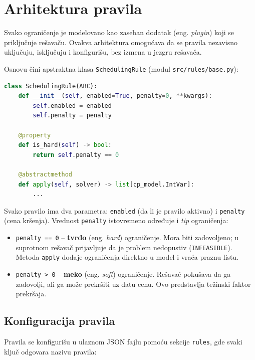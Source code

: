 \documentclass[12pt,oneside]{memoir}
\begin{document}
\section{Arhitektura pravila}
\label{sec:arhitektura_pravila}

Svako ograničenje je modelovano kao zaseban dodatak (eng. \emph{plugin})
koji se priključuje rešavaču. Ovakva arhitektura omogućava da se pravila
nezavisno uključuju, isključuju i konfigurišu, bez izmena u jezgru
rešavača.

Osnovu čini apstraktna klasa \texttt{SchedulingRule} (modul
\texttt{src/rules/base.py}):

\begin{english}
\begin{lstlisting}[language=Python, caption={Apstraktna klasa pravila}]
class SchedulingRule(ABC):
    def __init__(self, enabled=True, penalty=0, **kwargs):
        self.enabled = enabled
        self.penalty = penalty

    @property
    def is_hard(self) -> bool:
        return self.penalty == 0

    @abstractmethod
    def apply(self, solver) -> list[cp_model.IntVar]:
        ...
\end{lstlisting}
\end{english}

Svako pravilo ima dva parametra: \texttt{enabled} (da li je pravilo
aktivno) i \texttt{penalty} (cena kršenja). Vrednost \texttt{penalty}
istovremeno određuje i \emph{tip} ograničenja:

\begin{itemize}
\item \texttt{penalty == 0} -- \textbf{tvrdo} (eng. \emph{hard})
  ograničenje. Mora biti zadovoljeno; u suprotnom rešavač prijavljuje
  da je problem nedopustiv (\texttt{INFEASIBLE}). Metoda \texttt{apply}
  dodaje ograničenja direktno u model i vraća praznu listu.
\item \texttt{penalty > 0} -- \textbf{meko} (eng. \emph{soft})
  ograničenje. Rešavač pokušava da ga zadovolji, ali ga može prekršiti
  uz datu cenu. Ovo predstavlja težinski faktor prekršaja.
\end{itemize}

\subsection{Konfiguracija pravila}

Pravila se konfigurišu u ulaznom JSON fajlu pomoću sekcije
\texttt{rules}, gde svaki ključ odgovara nazivu pravila:
\end{document}
